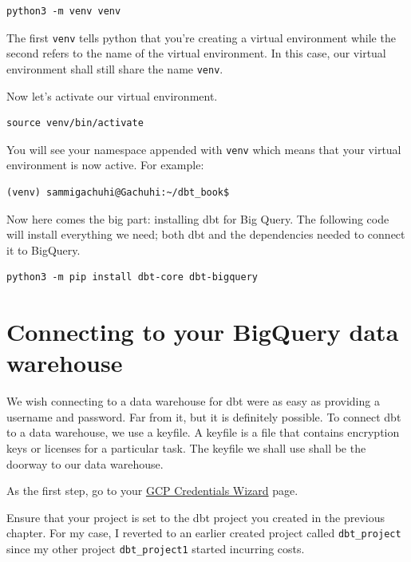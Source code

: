 \documentclass[
]{book}
\begin{document}
\begin{verbatim}
python3 -m venv venv
\end{verbatim}

The first \texttt{venv} tells python that you're creating a virtual environment while the second refers to the name of the virtual environment. In this case, our virtual environment shall still share the name \texttt{venv}.

Now let's activate our virtual environment.

\begin{verbatim}
source venv/bin/activate
\end{verbatim}

You will see your namespace appended with \texttt{venv} which means that your virtual environment is now active. For example:

\begin{verbatim}
(venv) sammigachuhi@Gachuhi:~/dbt_book$ 
\end{verbatim}

Now here comes the big part: installing dbt for Big Query. The following code will install everything we need; both dbt and the dependencies needed to connect it to BigQuery.

\begin{verbatim}
python3 -m pip install dbt-core dbt-bigquery
\end{verbatim}

\hypertarget{connecting-to-your-bigquery-data-warehouse}{%
\section{Connecting to your BigQuery data warehouse}\label{connecting-to-your-bigquery-data-warehouse}}

We wish connecting to a data warehouse for dbt were as easy as providing a username and password. Far from it, but it is definitely possible. To connect dbt to a data warehouse, we use a keyfile. A keyfile is a file that contains encryption keys or licenses for a particular task. The keyfile we shall use shall be the doorway to our data warehouse.

As the first step, go to your \href{https://console.cloud.google.com/apis/credentials/wizard}{GCP Credentials Wizard} page.

Ensure that your project is set to the dbt project you created in the previous chapter. For my case, I reverted to an earlier created project called \texttt{dbt\_project} since my other project \texttt{dbt\_project1} started incurring costs.
\end{document}
